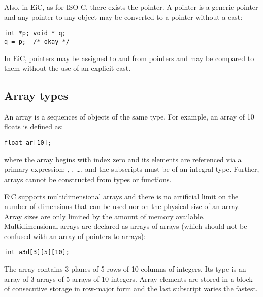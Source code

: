 Also, in EiC, as for ISO C, there exists the 
pointer. A  pointer is a generic
pointer and any pointer to any object may be
converted to a  pointer without a cast:
\begin{production}
\begin{verbatim}
int *p; void * q;
q = p;  /* okay */
\end{verbatim}
\end{production}
 In EiC, pointers may be assigned to and from  pointers and
may be compared to them without the use of an explicit cast. 

 
\subsection{Array types}
\label{sec:ArrayTypes}
 
An array is a sequences of objects of the same type. For example, an
array of 10 floats is defined as:

\begin{production}
\begin{verbatim}
float ar[10];
\end{verbatim}
\end{production}

where the array begins with index zero and its elements are referenced
via a primary expression: , , \ldots,
 and the subscripts must be of an integral type. 
Further, arrays cannot be constructed from  types or functions.

EiC supports multidimensional arrays and there is no artificial limit
on the number of dimensions that can be used nor on the physical size
of an array. Array sizes are only limited by the amount of memory
available. Multidimensional arrays are declared as arrays of arrays
(which should not be confused with an array of pointers to arrays):

\begin{production}
\begin{verbatim}
int a3d[3][5][10];
\end{verbatim}
\end{production}

The array  contains 3 planes of 5 rows of 10 columns of
integers. Its type is an array of 3 arrays of 5 arrays of 10 integers.
Array elements are stored in a block of consecutive storage in
row-major form and the last subscript varies
the fastest.

